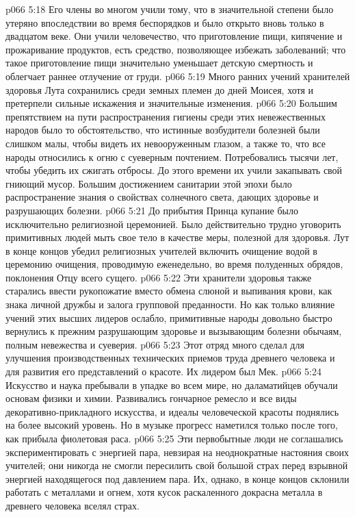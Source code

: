 \vs p066 5:18 Его члены во многом учили тому, что в значительной степени было утеряно впоследствии во время беспорядков и было открыто вновь только в двадцатом веке. Они учили человечество, что приготовление пищи, кипячение и прожаривание продуктов, есть средство, позволяющее избежать заболеваний; что такое приготовление пищи значительно уменьшает детскую смертность и облегчает раннее отлучение от груди.
\vs p066 5:19 Много ранних учений хранителей здоровья Лута сохранились среди земных племен до дней Моисея, хотя и претерпели сильные искажения и значительные изменения.
\vs p066 5:20 Большим препятствием на пути распространения гигиены среди этих невежественных народов было то обстоятельство, что истинные возбудители болезней были слишком малы, чтобы видеть их невооруженным глазом, а также то, что все народы относились к огню с суеверным почтением. Потребовались тысячи лет, чтобы убедить их сжигать отбросы. До этого времени их учили закапывать свой гниющий мусор. Большим достижением санитарии этой эпохи было распространение знания о свойствах солнечного света, дающих здоровье и разрушающих болезни.
\vs p066 5:21 До прибытия Принца купание было исключительно религиозной церемонией. Было действительно трудно уговорить примитивных людей мыть свое тело в качестве меры, полезной для здоровья. Лут в конце концов убедил религиозных учителей включить очищение водой в церемонию очищения, проводимую еженедельно, во время полуденных обрядов, поклонения Отцу всего сущего.
\vs p066 5:22 Эти хранители здоровья также старались ввести рукопожатие вместо обмена слюной и выпивания крови, как знака личной дружбы и залога групповой преданности. Но как только влияние учений этих высших лидеров ослабло, примитивные народы довольно быстро вернулись к прежним разрушающим здоровье и вызывающим болезни обычаям, полным невежества и суеверия.
\vs p066 5:23 \bibnobreakspace {} Этот отряд много сделал для улучшения производственных технических приемов труда древнего человека и для развития его представлений о красоте. Их лидером был Мек.
\vs p066 5:24 Искусство и наука пребывали в упадке во всем мире, но даламатийцев обучали основам физики и химии. Развивались гончарное ремесло и все виды декоративно\hyp{}прикладного искусства, и идеалы человеческой красоты поднялись на более высокий уровень. Но в музыке прогресс наметился только после того, как прибыла фиолетовая раса.
\vs p066 5:25 Эти первобытные люди не соглашались экспериментировать с энергией пара, невзирая на неоднократные настояния своих учителей; они никогда не смогли пересилить свой большой страх перед взрывной энергией находящегося под давлением пара. Их, однако, в конце концов склонили работать с металлами и огнем, хотя кусок раскаленного докрасна металла в древнего человека вселял страх.
